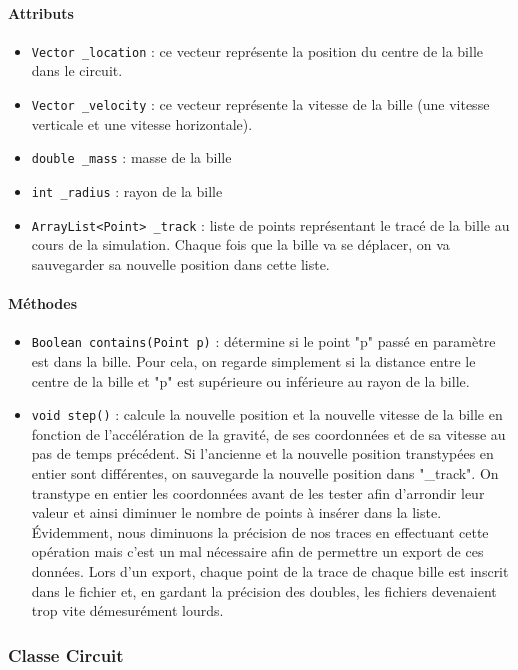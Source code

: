 \documentclass{report}
\begin{document}
\paragraph*{Attributs}
\begin{itemize}
\item \texttt{Vector \_location} : ce vecteur représente la position du centre de la bille dans le circuit. 
\item \texttt{Vector \_velocity} : ce vecteur représente la vitesse de la bille (une vitesse verticale et une vitesse horizontale).
\item \texttt{double \_mass} : masse de la bille
\item \texttt{int \_radius} : rayon de la bille
\item \texttt{ArrayList<Point> \_track} : liste de points représentant le tracé de la bille au cours de la simulation. Chaque fois que la bille va se déplacer, on va sauvegarder sa nouvelle position dans cette liste.
\end{itemize}

\paragraph*{Méthodes}
\begin{itemize}
\item \texttt{Boolean contains(Point p)} : détermine si le point "p" passé en paramètre est dans la bille. Pour cela, on regarde simplement si la distance entre le centre de la bille et "p" est supérieure ou inférieure au rayon de la bille.
\item \texttt{void step()} : calcule la nouvelle position et la nouvelle vitesse de la bille en fonction de l'accélération de la gravité, de ses coordonnées et de sa vitesse au pas de temps précédent. Si l'ancienne et la nouvelle position transtypées en entier sont différentes, on sauvegarde la nouvelle position dans "\_track". On transtype en entier les coordonnées avant de les tester afin d'arrondir leur valeur et ainsi diminuer le nombre de points à insérer dans la liste. Évidemment, nous diminuons la précision de nos traces en effectuant cette opération mais c'est un mal nécessaire afin de permettre un export de ces données. Lors d'un export, chaque point de la trace de chaque bille est inscrit dans le fichier et, en gardant la précision des doubles, les fichiers devenaient trop vite démesurément lourds.
\end{itemize}

\newpage
\subsubsection{Classe Circuit}
\end{document}
